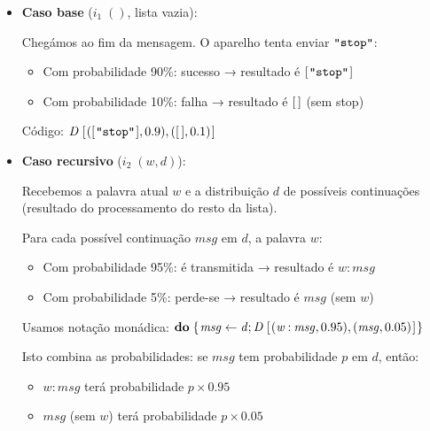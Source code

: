 \documentclass[11pt, a4paper, fleqn]{article}
\newcommand{\Conid}[1]{\mathit{#1}}
\newcommand{\Varid}[1]{\mathit{#1}}
\begin{document}
\begin{itemize}
\item \textbf{Caso base} (\ensuremath{i_1\;()}, lista vazia): 
  
  Chegámos ao fim da mensagem. O aparelho tenta enviar \ensuremath{\text{\ttfamily \char34 stop\char34}}:
  \begin{itemize}
    \item Com probabilidade 90\%: sucesso → resultado é \ensuremath{[\mskip1.5mu \text{\ttfamily \char34 stop\char34}\mskip1.5mu]}
    \item Com probabilidade 10\%: falha → resultado é \ensuremath{[\mskip1.5mu \mskip1.5mu]} (sem stop)
  \end{itemize}
  
  Código: \ensuremath{\Conid{D}\;[\mskip1.5mu ([\mskip1.5mu \text{\ttfamily \char34 stop\char34}\mskip1.5mu],\mathrm{0.9}),([\mskip1.5mu \mskip1.5mu],\mathrm{0.1})\mskip1.5mu]}

\item \textbf{Caso recursivo} (\ensuremath{i_2\;(\Varid{w},\Varid{d})}): 
  
  Recebemos a palavra atual \ensuremath{\Varid{w}} e a distribuição \ensuremath{\Varid{d}} de possíveis continuações (resultado do processamento do resto da lista).
  
  Para cada possível continuação \ensuremath{\Varid{msg}} em \ensuremath{\Varid{d}}, a palavra \ensuremath{\Varid{w}}:
  \begin{itemize}
    \item Com probabilidade 95\%: é transmitida → resultado é \ensuremath{\Varid{w}\mathbin{:}\Varid{msg}}
    \item Com probabilidade 5\%: perde-se → resultado é \ensuremath{\Varid{msg}} (sem \ensuremath{\Varid{w}})
  \end{itemize}
  
  Usamos notação monádica: \ensuremath{\mathbf{do}\;\{\mskip1.5mu \Varid{msg}\leftarrow \Varid{d};\Conid{D}\;[\mskip1.5mu (\Varid{w}\mathbin{:}\Varid{msg},\mathrm{0.95}),(\Varid{msg},\mathrm{0.05})\mskip1.5mu]\mskip1.5mu\}}
  
  Isto combina as probabilidades: se \ensuremath{\Varid{msg}} tem probabilidade \ensuremath{\Varid{p}} em \ensuremath{\Varid{d}}, então:
  \begin{itemize}
    \item \ensuremath{\Varid{w}\mathbin{:}\Varid{msg}} terá probabilidade $p \times 0.95$
    \item \ensuremath{\Varid{msg}} (sem \ensuremath{\Varid{w}}) terá probabilidade $p \times 0.05$
  \end{itemize}
\end{itemize}
\end{document}
